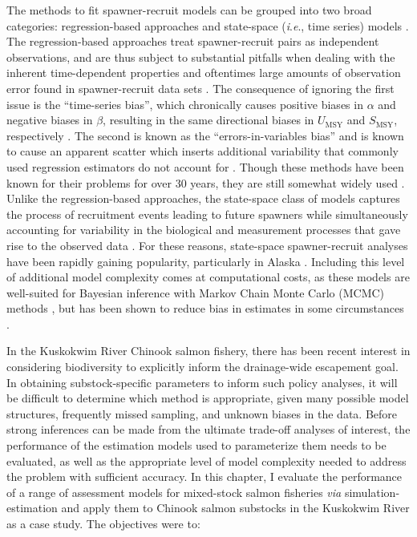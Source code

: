 \documentclass[12pt,]{book}
\theoremstyle{definition}
\theoremstyle{definition}
\theoremstyle{definition}
\theoremstyle{remark}
\begin{document}
The methods to fit spawner-recruit models can be grouped into two broad
categories: regression-based approaches
\citep[\emph{e}.\emph{g}.,][]{clark-etal-2009} and state-space
(\emph{i}.\emph{e}., time series) models
\citep[\emph{e}.\emph{g}.,][]{fleischman-etal-2013, su-peterman-2012}.
The regression-based approaches treat spawner-recruit pairs as
independent observations, and are thus subject to substantial pitfalls
when dealing with the inherent time-dependent properties and oftentimes
large amounts of observation error found in spawner-recruit data sets
\citep[Ch. 7]{walters-martell-2004}. The consequence of ignoring the
first issue is the ``time-series bias'', which chronically causes
positive biases in \(\alpha\) and negative biases in \(\beta\),
resulting in the same directional biases in \(U_{\text{MSY}}\) and
\(S_{\text{MSY}}\), respectively \citep[\emph{i}.\emph{e}., spuriously
providing too aggressive harvest policy
recommendations;][]{walters-1985}. The second is known as the
``errors-in-variables bias'' and is known to cause an apparent scatter
which inserts additional variability that commonly used regression
estimators do not account for \citep{ludwig-walters-1981}. Though these
methods have been known for their problems for over 30 years, they are
still somewhat widely used
\citep[\emph{e}.\emph{g}.,][]{korman-english-2013}. Unlike the
regression-based approaches, the state-space class of models captures
the process of recruitment events leading to future spawners while
simultaneously accounting for variability in the biological and
measurement processes that gave rise to the observed data
\citep{devalpine-hastings-2002, fleischman-etal-2013}. For these
reasons, state-space spawner-recruit analyses have been rapidly gaining
popularity, particularly in Alaska
\citep{fleischman-etal-2013, staton-etal-2017-intseq, su-peterman-2012}.
Including this level of additional model complexity comes at
computational costs, as these models are well-suited for Bayesian
inference with Markov Chain Monte Carlo (MCMC) methods \citep[Ch.
4]{newman-etal-2014}, but has been shown to reduce bias in estimates in
some circumstances \citep{su-peterman-2012, walters-martell-2004}.

In the Kuskokwim River Chinook salmon fishery, there has been recent
interest in considering biodiversity to explicitly inform the
drainage-wide escapement goal. In obtaining substock-specific parameters
to inform such policy analyses, it will be difficult to determine which
method is appropriate, given many possible model structures, frequently
missed sampling, and unknown biases in the data. Before strong
inferences can be made from the ultimate trade-off analyses of interest,
the performance of the estimation models used to parameterize them needs
to be evaluated, as well as the appropriate level of model complexity
needed to address the problem with sufficient accuracy. In this chapter,
I evaluate the performance of a range of assessment models for
mixed-stock salmon fisheries \emph{via} simulation-estimation and apply
them to Chinook salmon substocks in the Kuskokwim River as a case study.
The objectives were to:
\end{document}
